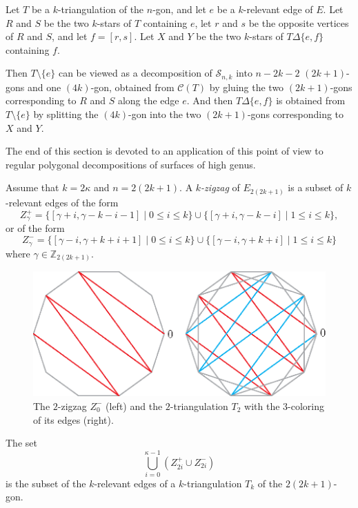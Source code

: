 \documentclass[12pt]{amsart}
\begin{document}
\begin{remark}
Let $T$ be a $k$-triangulation of the $n$-gon, and let $e$ be a $k$-relevant edge of $E$. Let $R$ and $S$ be the two $k$-stars of $T$ containing $e$, let $r$ and $s$ be the opposite vertices of $R$ and $S$, and let $f=[r,s]$. Let $X$ and $Y$ be the two $k$-stars of $T\Delta\{e,f\}$ containing $f$.

Then $T\setminus\{e\}$ can be viewed as a decomposition of $\mathcal{S}_{n,k}$ into $n-2k-2$ $(2k+1)$-gons and one $(4k)$-gon, obtained from $\mathcal{C}(T)$ by gluing the two $(2k+1)$-gons corresponding to $R$ and $S$ along the edge $e$. And then $T\Delta\{e,f\}$ is obtained from $T\setminus\{e\}$ by splitting the $(4k)$-gon into the two $(2k+1)$-gons corresponding to $X$ and $Y$.
\end{remark}

The end of this section is devoted to an application of this point of view to regular polygonal decompositions of surfaces of high genus.

Assume that $k=2\kappa$ and $n=2(2k+1)$. A \emph{$k$-zigzag} of $E_{2(2k+1)}$ is a subset of $k$-relevant edges of the form
$$Z_\gamma^+=\{[\gamma+i,\gamma-k-i-1]\;|\; 0\le i\le k\}\cup\{[\gamma+i,\gamma-k-i]\;|\; 1\le i\le k\},$$
or of the form
$$Z_\gamma^-=\{[\gamma-i,\gamma+k+i+1]\;|\; 0\le i\le k\}\cup\{[\gamma-i,\gamma+k+i]\;|\; 1\le i\le k\}$$
where $\gamma\in\mathbb{Z}_{2(2k+1)}$.

\begin{figure}
\centerline{\includegraphics[scale=1]{10-gon.eps}}
\caption{\small{The $2$-zigzag $Z_0^-$ (left) and the $2$-triangulation $T_2$ with the $3$-coloring of its edges (right).}}\label{10-gon}
\end{figure}


\begin{lemma}
The set
$$\bigcup_{i=0}^{\kappa-1} (Z_{2i}^+\cup Z_{2i}^-)$$
is the subset of the $k$-relevant edges of a $k$-triangulation $T_k$ of the $2(2k+1)$-gon.
\end{lemma}
\end{document}
